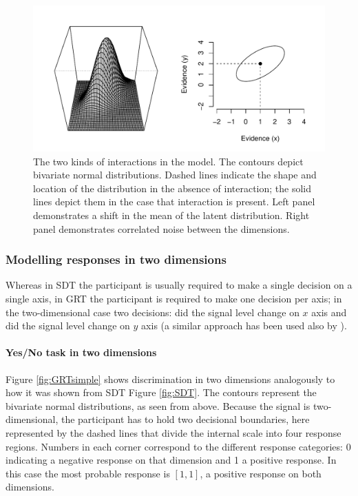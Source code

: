 \documentclass{article}\usepackage{knitr}
\begin{document}
\begin{figure}
\begin{center}
\begin{knitrout}
\color{fgcolor}
\includegraphics[width=\maxwidth]{figure/unnamed-chunk-8-1} 

\end{knitrout}
\end{center}
\caption{The two kinds of interactions in the model. The contours depict bivariate normal distributions. Dashed lines indicate the shape and location of the distribution in the absence of interaction; the solid lines depict them in the case that interaction is present. Left panel demonstrates a shift in the mean of the latent distribution. Right panel demonstrates correlated noise between the dimensions.}
\label{fig:GRTinteractions}
\end{figure}

\subsubsection{Modelling responses in two dimensions}
\label{sec:modelling_responses}

Whereas in SDT the participant is usually required to make a single decision on a single axis, in GRT the participant is required to make one decision per axis; in the two-dimensional case two decisions: did the signal level change on $x$ axis and did the signal level change on $y$ axis (a similar approach has been used also by \cite{wickens1992}). 

\paragraph{Yes/No task in two dimensions}

Figure \ref{fig:GRTsimple} shows discrimination in two dimensions analogously to how it was shown from SDT Figure \ref{fig:SDT}. The contours represent the bivariate normal distributions, as seen from above. Because the signal is two-dimensional, the participant has to hold two decisional boundaries, here represented by the dashed lines that divide the internal scale into four response regions. Numbers in each corner correspond to the different response categories: 0 indicating a negative response on that dimension and 1 a positive response. In this case the most probable response is $[1,1]$, a positive response on both dimensions.
\end{document}
